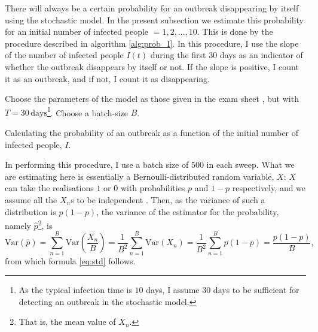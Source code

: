 There will always be a certain probability for an outbreak disappearing by itself using the stochastic model. In the present subsection we estimate this probability for an initial number of infected people $=1,2,\dots,10$. This is done by the procedure described in algorithm \ref{alg:prob_I}. In this procedure, I use the slope of the number of infected people $I(t)$ during the first $30$ days as an indicator of whether the outbreak disappears by itself or not. If the slope is positive, I count it as an outbreak, and if not, I count it as disappearing.

\begin{algorithm}[H]
	Choose the parameters of the model as those given in the exam sheet \cite{sheet}, but with $T = 30 \, \mathrm{days}$\footnote{As the typical infection time is $10$ days, I assume 30 days to be sufficient for detecting an outbreak in the stochastic model.}. \;
	Choose a batch-size $B$.\;
	\caption{Calculating the probability of an outbreak as a function of the initial number of infected people, $I$. }
	\label{alg:prob_I}
\end{algorithm} 

In performing this procedure, I use a batch size of $500$ in each sweep. What we are estimating here is essentially a Bernoulli-distributed random variable, $X$: $X$ can take the realisations $1$ or $0$ with probabilities $p$ and $1-p$ respectively, and we assume all the $X_n$s to be independent \cite[~p.26]{Wassermann}. Then, as the variance of such a distribution is $p(1-p)$, the variance of the estimator for the probability, namely $\hat{p}$\footnote{That is, the mean value of $X_n$.}, is 
$$
	\mathrm{Var}(\hat{p}) =  \sum_{n= 1}^{B} \mathrm{Var}\left(\frac{X_n}{B}\right) = \frac{1}{B^2} \sum_{n= 1}^{B} \mathrm{Var}(X_n) = \frac{1}{B^2} \sum_{n= 1}^{B} p (1-p) = \frac{p(1-p)}{B},
$$
from which formula \eqref{eq:std} follows. 

